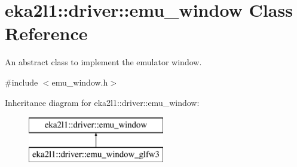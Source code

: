 \hypertarget{classeka2l1_1_1driver_1_1emu__window}{}\section{eka2l1\+:\+:driver\+:\+:emu\+\_\+window Class Reference}
\label{classeka2l1_1_1driver_1_1emu__window}


An abstract class to implement the emulator window.  




{\ttfamily \#include $<$emu\+\_\+window.\+h$>$}

Inheritance diagram for eka2l1\+:\+:driver\+:\+:emu\+\_\+window\+:\begin{figure}[H]
\begin{center}
\leavevmode
\includegraphics[height=2.000000cm]{classeka2l1_1_1driver_1_1emu__window}
\end{center}
\end{figure}
